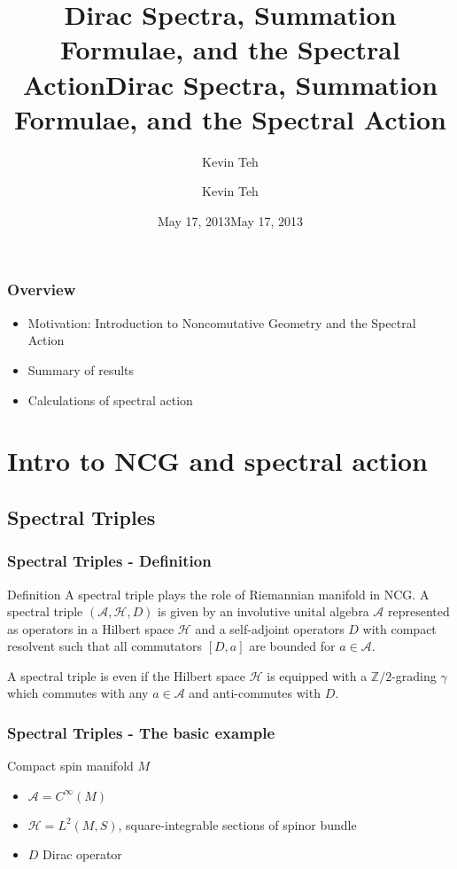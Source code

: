\documentclass{beamer}
\title{Dirac Spectra, Summation Formulae, and the Spectral Action} \author{Kevin Teh} \date{May 17, 2013}
\title{Dirac Spectra, Summation Formulae, and the Spectral Action}
\author{Kevin Teh}
\institute{Caltech}
\date{May 17, 2013}
\def\Z{{\mathbb Z}}
\def\cA{{\mathcal A}}
\def\cH{{\mathcal H}}
\begin{document}
\begin{frame}
\titlepage
\end{frame}

\begin{frame}
\frametitle{Overview}
\begin{itemize}
\item Motivation: Introduction to Noncomutative Geometry and the Spectral Action
\item Summary of results
\item Calculations of spectral action
\end{itemize}
\end{frame}

\section{Intro to NCG and spectral action}

\subsection{Spectral Triples}
\begin{frame}
  \frametitle{Spectral Triples - Definition}
  \begin{block}{Definition}
    A spectral triple plays the role of Riemannian manifold in NCG. A spectral triple $(\cA, \cH, D)$ is given by an involutive unital algebra $\cA$ represented as operators in a Hilbert space $\cH$ and a self-adjoint operators $D$ with compact resolvent such that all commutators $[D, a]$ are bounded for $a \in \cA$.
  \end{block}
  \pause

  \begin{block}{}
    A spectral triple is even if the Hilbert space $\cH$ is equipped with a $\Z /2 $-grading $\gamma$ which commutes with any $a \in \cA$ and anti-commutes with $D$.
\end{block}
\end{frame}


\begin{frame}
  \frametitle{Spectral Triples - The basic example}
  \begin{exampleblock}{Compact spin manifold $M$}
    \begin{itemize}
      \item $\cA = C^{\infty}(M)$
      \item $\cH = L^2(M, S)$, square-integrable sections of spinor bundle
      \item $D$ Dirac operator
    \end{itemize}
  \end{exampleblock}
\end{frame}
\end{document}
